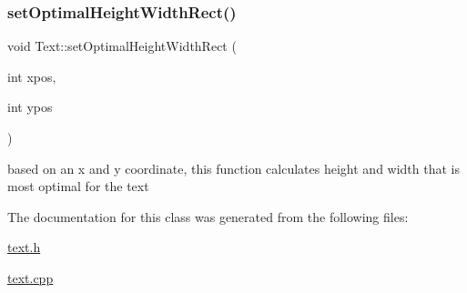 \subsubsection{\texorpdfstring{set\+Optimal\+Height\+Width\+Rect()}{setOptimalHeightWidthRect()}}
{\footnotesize\ttfamily void Text\+::set\+Optimal\+Height\+Width\+Rect (\begin{DoxyParamCaption}\item[{int}]{xpos,  }\item[{int}]{ypos }\end{DoxyParamCaption})}

based on an x and y coordinate, this function calculates height and width that is most optimal for the text 

The documentation for this class was generated from the following files\+:\begin{DoxyCompactItemize}
\item 
\hyperlink{text_8h}{text.\+h}\item 
\hyperlink{text_8cpp}{text.\+cpp}\end{DoxyCompactItemize}
